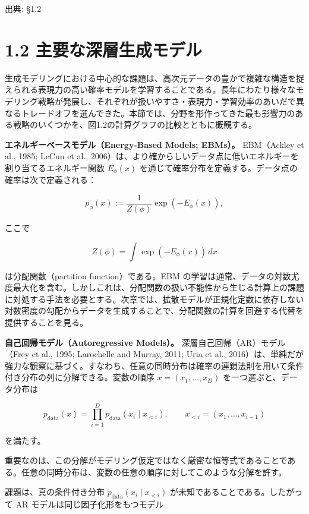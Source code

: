 

{\color{gray}\footnotesize 出典: §1.2\par}
\vspace{0.2em}

\section*{1.2 主要な深層生成モデル}


生成モデリングにおける中心的な課題は、高次元データの豊かで複雑な構造を捉えられる表現力の高い確率モデルを学習することである。長年にわたり様々なモデリング戦略が発展し、それぞれが扱いやすさ・表現力・学習効率のあいだで異なるトレードオフを選んできた。本節では、分野を形作ってきた最も影響力のある戦略のいくつかを、図1.2の計算グラフの比較とともに概観する。

\textbf{エネルギーベースモデル（Energy-Based Models; EBMs）。} EBM（Ackley et al., 1985; LeCun et al., 2006）は、より確からしいデータ点に低いエネルギーを割り当てるエネルギー関数 $E_\phi(x)$ を通じて確率分布を定義する。データ点の確率は次で定義される：

\[
p_\phi(x) := \frac{1}{Z(\phi)}\exp(-E_\phi(x)),
\]


ここで

\[
Z(\phi) = \int \exp(-E_\phi(x))\, dx
\]


は分配関数（partition function）である。EBM の学習は通常、データの対数尤度最大化を含む。しかしこれは、分配関数の扱い不能性から生じる計算上の課題に対処する手法を必要とする。次章では、拡散モデルが正規化定数に依存しない対数密度の勾配からデータを生成することで、分配関数の計算を回避する代替を提供することを見る。

\textbf{自己回帰モデル（Autoregressive Models）。} 深層自己回帰（AR）モデル（Frey et al., 1995; Larochelle and Murray, 2011; Uria et al., 2016）は、単純だが強力な観察に基づく。すなわち、任意の同時分布は確率の連鎖法則を用いて条件付き分布の列に分解できる。変数の順序 $x=(x_1,\ldots,x_D)$ を一つ選ぶと、データ分布は

\[
p_{\mathrm{data}}(x)=\prod_{i=1}^{D} p_{\mathrm{data}}(x_i\mid x_{<i}),\qquad x_{<i}=(x_1,\ldots,x_{i-1})
\]


を満たす。

重要なのは、この分解がモデリング仮定ではなく厳密な恒等式であることである。任意の同時分布は、変数の任意の順序に対してこのような分解を許す。

課題は、真の条件付き分布 $p_{\mathrm{data}}(x_i\mid x_{<i})$ が未知であることである。したがって AR モデルは同じ因子化形をもつモデル

